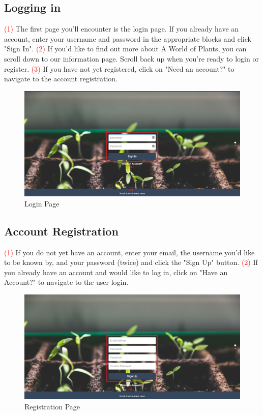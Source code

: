 \documentclass{article}
\begin{document}
	\subsection{Logging in}
		\textcolor{red}{(1)} The first page you'll encounter is the login page. If you already have an account, enter your username and password in the appropriate blocks and click "Sign In".
		\newline
		\textcolor{red}{(2)} If you'd like to find out more about A World of Plants, you can scroll down to our information page. Scroll back up when you're ready to login or register.
		\newline
		\textcolor{red}{(3)} If you have not yet registered, click on "Need an account?" to navigate to the account registration.
		\begin{figure}[H]
			\includegraphics[width=\textwidth]{../images/UserManual/login.PNG}
			\caption{Login Page}
		\end{figure}				
		
	\subsection{Account Registration}
		\textcolor{red}{(1)} If you do not yet have an account, enter your email, the username you'd like to be known by, and your password (twice) and click the "Sign Up" button.
		\newline
		\textcolor{red}{(2)} If you already have an account and would like to log in, click on "Have an Account?" to navigate to the user login.
		\newline
		\begin{figure}[H]
			\includegraphics[width=\textwidth]{../images/UserManual/registration.PNG}
			\caption{Registration Page}
		\end{figure}
		
\end{document}
